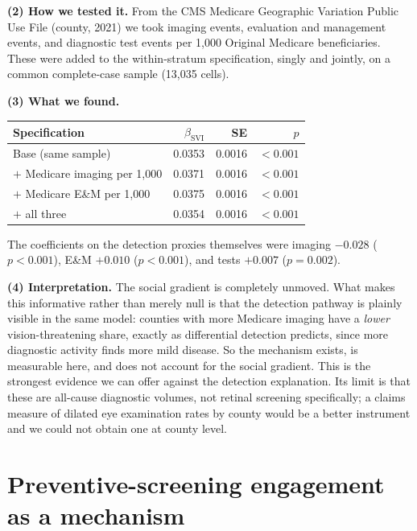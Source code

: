 \documentclass[11pt]{article}
\newcommand{\tpart}[1]{\medskip\noindent\textbf{#1}\quad}
\begin{document}
\tpart{(2) How we tested it.} From the CMS Medicare Geographic Variation Public
Use File (county, 2021) we took imaging events, evaluation and management
events, and diagnostic test events per 1,000 Original Medicare beneficiaries.
These were added to the within-stratum specification, singly and jointly, on a
common complete-case sample (13,035 cells).

\tpart{(3) What we found.}
\begin{center}
\begin{tabular}{lrrr}
\toprule
Specification & $\beta_{\mathrm{SVI}}$ & SE & $p$ \\
\midrule
Base (same sample)                & 0.0353 & 0.0016 & $<0.001$ \\
$+$ Medicare imaging per 1,000    & 0.0371 & 0.0016 & $<0.001$ \\
$+$ Medicare E\&M per 1,000       & 0.0375 & 0.0016 & $<0.001$ \\
$+$ all three                     & 0.0354 & 0.0016 & $<0.001$ \\
\bottomrule
\end{tabular}
\end{center}
The coefficients on the detection proxies themselves were imaging $-0.028$
($p<0.001$), E\&M $+0.010$ ($p<0.001$), and tests $+0.007$ ($p = 0.002$).

\tpart{(4) Interpretation.} The social gradient is completely unmoved. What
makes this informative rather than merely null is that the detection pathway is
plainly visible in the same model: counties with more Medicare imaging have a
\emph{lower} vision-threatening share, exactly as differential detection
predicts, since more diagnostic activity finds more mild disease. So the
mechanism exists, is measurable here, and does not account for the social
gradient. This is the strongest evidence we can offer against the detection
explanation. Its limit is that these are all-cause diagnostic volumes, not
retinal screening specifically; a claims measure of dilated eye examination
rates by county would be a better instrument and we could not obtain one at
county level.

\section{Preventive-screening engagement as a mechanism}
\end{document}
